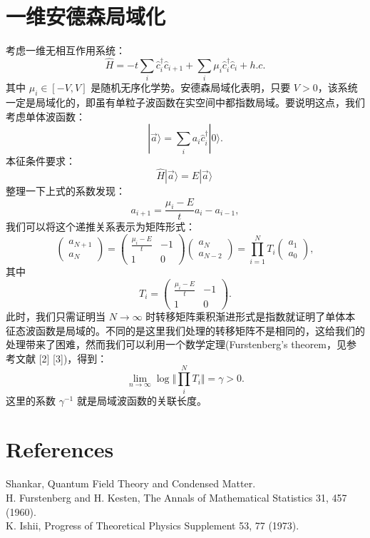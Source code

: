 \documentclass[UTF8]{ctexart}
\begin{document}
\section*{一维安德森局域化}
\noindent
考虑一维无相互作用系统：
\begin{equation}
	\hat{H} = -t\sum_i \hat{c}_i^\dagger \hat{c}_{i+1} + \sum_i \mu_i\hat{c}_i^\dagger \hat{c}_{i} +h.c.
\end{equation}
其中 $\mu_i \in [-V,V]$ 是随机无序化学势。安德森局域化表明，只要 $V>0$，该系统一定是局域化的，即虽有单粒子波函数在实空间中都指数局域。要说明这点，我们考虑单体波函数：
\begin{equation}
	|\vec{a}\rangle = \sum_i a_i \hat{c}^\dagger_i |0\rangle.
\end{equation}
本征条件要求：
\begin{equation}
	\hat{H}|\vec{a}\rangle = E|\vec{a}\rangle\,
\end{equation}
整理一下上式的系数发现：
\begin{equation}
	a_{i+1} = \frac{\mu_i-E}{t} a_i-a_{i-1},
\end{equation} 
我们可以将这个递推关系表示为矩阵形式：
\begin{equation}
	\left(
	\begin{array}{c}
		a_{N+1} \\
		a_{N}
	\end{array}
	\right) = 
	\left(
	\begin{array}{cc}
		\frac{\mu_i-E}{t} & -1 \\
		1 & 0
	\end{array}
	\right)
	\left(
	\begin{array}{c}
		a_{N} \\
		a_{N-2}
	\end{array}
	\right)
	=\prod_{i=1}^{N} T_i 
	\left(
	\begin{array}{c}
		a_{1} \\
		a_{0}
	\end{array}
	\right),
\end{equation}
其中
\begin{equation}
	T_i = \left(
	\begin{array}{cc}
		\frac{\mu_i-E}{t} & -1\\
		1 & 0
	\end{array}
	\right).
\end{equation} 
此时，我们只需证明当 $N\rightarrow \infty$ 时转移矩阵乘积渐进形式是指数就证明了单体本征态波函数是局域的。不同的是这里我们处理的转移矩阵不是相同的，这给我们的处理带来了困难，然而我们可以利用一个数学定理(Furstenberg's theorem，见参考文献 [2] [3])，得到：
\begin{equation}
	\lim_{n\rightarrow \infty}\log \Vert \prod_i^N T_i \Vert = \gamma>0.
\end{equation}
这里的系数 $\gamma^{-1}$ 就是局域波函数的关联长度。



\section*{References}
\noindent
[1] Shankar, Quantum Field Theory and Condensed Matter. \\
\noindent
[2] H. Furstenberg and H. Kesten, The Annals of Mathematical Statistics 31, 457 (1960). \\
\noindent
[3] K. Ishii, Progress of Theoretical Physics Supplement 53, 77 (1973).
\end{document}
